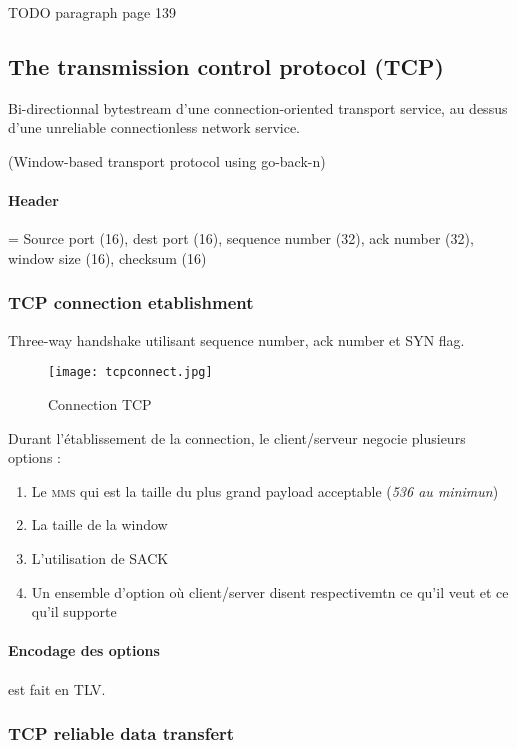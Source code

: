 TODO paragraph page 139

\subsection{The transmission control protocol (TCP)}

Bi-directionnal bytestream d'une connection-oriented transport service, au dessus d'une unreliable connectionless network service.

(Window-based transport protocol using go-back-n)

\paragraph{Header} = Source port (16), dest port (16), sequence number (32), ack number (32),
window size (16), checksum (16)

\subsubsection{TCP connection etablishment}
Three-way handshake utilisant sequence number, ack number et SYN flag.

\begin{figure}[!ht]
  \centering
  \texttt{[image: tcpconnect.jpg]}
  \caption{Connection TCP}
  \label{fig:tcpconnect}
\end{figure}

Durant l'établissement de la connection, le client/serveur negocie plusieurs options :
\begin{enumerate}
  \item Le \textsc{mms} qui est la taille du plus grand payload acceptable (\textit{536 au minimun})
  \item La taille de la window
  \item L'utilisation de SACK
  \item Un ensemble d'option où client/server disent respectivemtn ce qu'il veut et ce
    qu'il supporte
\end{enumerate}

\paragraph{Encodage des options} est fait en \textsc{TLV}.

\subsubsection{TCP reliable data transfert}

